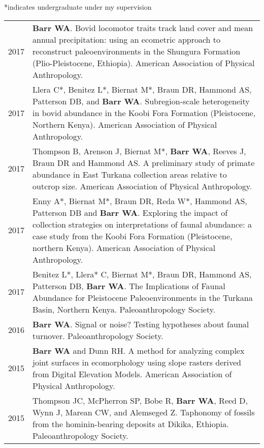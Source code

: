 \documentclass{article}
\newenvironment{mylist}
{\begin{description}[style=unboxed,leftmargin=1.3cm]}
{\end{description}}
\begin{document}
\begin{mylist}
\item[] *indicates undergraduate under my supervision
\end{mylist}

\begin{longtable}{p{}p{}}
2017 & {\bfseries Barr WA}. Bovid locomotor traits track land cover and mean annual precipitation: using an ecometric approach to reconstruct paleoenvironments in the Shungura Formation (Plio-Pleistocene, Ethiopia). American Association of Physical Anthropology.\\[4pt]
2017 & Llera C*, Benitez L*, Biernat M*, Braun DR,  Hammond AS, Patterson DB, and {\bfseries Barr WA}. Subregion-scale heterogeneity in bovid abundance in the Koobi Fora Formation (Pleistocene, Northern Kenya).  American Association of Physical Anthropology.\\[4pt]
2017 & Thompson B, Arenson J, Biernat M*,  {\bfseries Barr WA}, Reeves J, Braun DR and Hammond AS. A preliminary study of primate abundance in East Turkana collection areas relative to outcrop size. American Association of Physical Anthropology.\\[4pt]
2017 & Enny A*, Biernat M*, Braun DR, Reda W*, Hammond AS, Patterson DB and {\bfseries Barr WA}. Exploring the impact of collection strategies on interpretations of faunal abundance: a case study from the Koobi Fora Formation (Pleistocene, northern Kenya). American Association of Physical Anthropology.\\[4pt]
2017 & Benitez L*, Llera* C, Biernat M*, Braun DR, Hammond AS, Patterson DB, {\bfseries Barr WA}. The Implications of Faunal Abundance for Pleistocene Paleoenvironments in the Turkana Basin, Northern Kenya. Paleoanthropology Society. \\[4pt]

2016 & {\bfseries Barr WA}. Signal or noise? Testing hypotheses about faunal turnover. Paleoanthropology Society. \\[4pt]

2015 & {\bfseries Barr WA} and Dunn RH. A method for analyzing complex joint surfaces in ecomorphology using slope rasters derived from Digital Elevation Models. American Association of Physical Anthropology.\\[4pt]
2015 & Thompson JC, McPherron SP, Bobe R, {\bfseries Barr WA}, Reed D, Wynn J, Marean CW, and Alemseged Z. Taphonomy of fossils from the hominin-bearing deposits at Dikika, Ethiopia. Paleoanthropology Society.\\[4pt]


\end{longtable}
\end{document}
